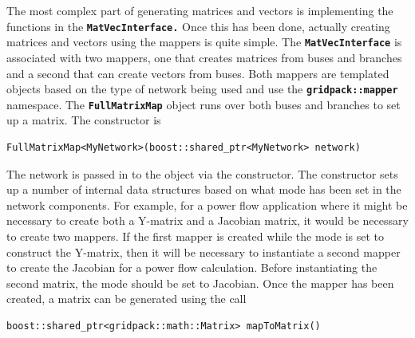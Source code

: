 \documentclass[12pt]{report} %
\begin{document}





The most complex part of generating matrices and vectors is implementing the functions in the \texttt{\textbf{MatVecInterface.}} Once this has been done, actually creating matrices and vectors using the mappers is quite simple. The \texttt{\textbf{MatVecInterface}} is associated with two mappers, one that creates matrices from buses and branches and a second that can create vectors from buses. Both mappers are templated objects based on the type of network being used and use the \texttt{\textbf{gridpack::mapper}} namespace. The \texttt{\textbf{FullMatrixMap}} object runs over both buses and branches to set up a matrix. The constructor is

{
\color{red}
\begin{Verbatim}[fontseries=b]
FullMatrixMap<MyNetwork>(boost::shared_ptr<MyNetwork> network)
\end{Verbatim}
}

The network is passed in to the object via the constructor. The constructor sets up a number of internal data structures based on what mode has been set in the network components. For example, for a power flow application where it might be necessary to create both a Y-matrix and a Jacobian matrix, it would be necessary to create two mappers. If the first mapper is created while the mode is set to construct the Y-matrix, then it will be necessary to instantiate a second mapper to create the Jacobian for a power flow calculation. Before instantiating the second matrix, the mode should be set to Jacobian.
Once the mapper has been created, a matrix can be generated using the call

{
\color{red}
\begin{Verbatim}[fontseries=b]
boost::shared_ptr<gridpack::math::Matrix> mapToMatrix()
\end{Verbatim}
}
\end{document}
